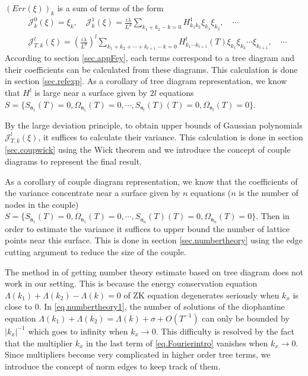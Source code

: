$(Err(\xi))_{k}$ is a sum of terms of the form
\begin{equation}
\begin{split}
    &\mathcal{J}_{k}^0(\xi)=  \xi_k, \quad \mathcal{J}_k^1(\xi)=\frac{i\lambda}{L^{d}} \sum_{k_1+k_2-k=0} H^1_{k_1k_2}  \xi_{k_1}\xi_{k_2} , \quad\cdots  \\
    &\mathcal{J}_{T,k}^l(\xi)=\left(\frac{i\lambda}{L^{d}}\right)^l\sum_{k_1+k_2+\cdots+k_{l+1}-k=0} H^l_{k_1\cdots k_{l+1}}(T)  \xi_{k_1}\xi_{k_2}\cdots\xi_{k_{l+1}}, \quad\cdots 
\end{split}
\end{equation}
According to section \ref{sec.appFey}, each terms correspond to a tree diagram and their coefficients can be calculated from these diagrams. This calculation is done in section \ref{sec.refexp}. As a corollary of tree diagram representation, we know that $H^l$ is large near a surface given by $2l$ equations $S=\{S_{\mathfrak{n}_1}(T)=0,\Omega_{\mathfrak{n}_1}(T)=0,\cdots,S_{\mathfrak{n}_{l}}(T)(T)=0,\Omega_{\mathfrak{n}_l}(T)=0\}$.

By the large deviation principle, to obtain upper bounds of Gaussian polynomials $\mathcal{J}_{T,k}^l(\xi)$, it suffices to calculate their variance. This calculation is done in section \ref{sec.coupwick} using the Wick theorem and we introduce the concept of couple diagrams to represent the final result. 

As a corollary of couple diagram representation, we know that the coefficients of the variance concentrate near a surface given by $n$ equations ($n$ is the number of nodes in the couple) $S=\{S_{\mathfrak{n}_1}(T)=0,\Omega_{\mathfrak{n}_1}(T)=0,\cdots,S_{\mathfrak{n}_{n}}(T)(T)=0,\Omega_{\mathfrak{n}_n}(T)=0\}$. Then in order to estimate the variance it suffices to upper bound the number of lattice points near this surface. This is done in section \ref{sec.numbertheory} using the edge cutting argument to reduce the size of the couple. 

The method in \cite{deng2021derivation} of getting number theory estimate based on tree diagram does not work in our setting. This is because the energy conservation equation $\Lambda(k_1)+\Lambda(k_2)-\Lambda(k)=0$ of ZK equation degenerates seriously when $k_{x}$ is close to $0$. In \eqref{eq.numbertheory1}, the number of solutions of the diophantine equation $\Lambda(k_1)+\Lambda(k_2)=\Lambda(k)+\sigma+O(T^{-1})$ can only be bounded by $|k_x|^{-1}$ which goes to infinity when $k_{x}\rightarrow 0$. This difficulty is resolved by the fact that the multiplier $k_x$ in the last term of \eqref{eq.Fourierintro} vanishes when $k_{x}\rightarrow 0$. Since multipliers become very complicated in higher order tree terms, we introduce the concept of norm edges to keep track of them. 

